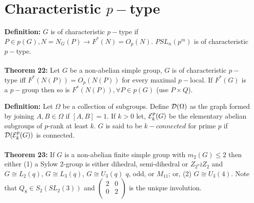 \section {Characteristic $p-$type}
{\bf Definition:}
$G$ is of characteristic $p-$type if $P \in p(G), N= N_G(P) \rightarrow F^*(N)=O_p(N)$.
$PSL_n(p^m)$ is of characteristic $p-$type.  \\
\\
{\bf Theorem 22:} Let $G$ be a non-abelian simple group,
$G$ is of characteristic $p-$type iff $F^*(N(P))= O_p(N(P))$ for every maximal $p-$local.
If $F^*(G)$ is a $p-$group then so is $F^*(N(P)), \forall P \in p(G)$ (use $P \times Q$).
\begin{quote}
\end{quote}
{\bf Definition:}
Let $\Omega$ be a collection of subgroups.  Define ${\cal D} (\Omega)$ as the graph
formed by joining $A,B \in \Omega$ if $[A,B]=1$. If $k > 0$ let, ${\cal E}^p_k (G)$
be the elementary abelian subgroups of $p$-rank at least $k$. $G$ is said to be
$k-connected$ for prime $p$ if ${\cal D} ( {\cal E}^p_k (G))$
is connected.
\\
\\
{\bf Theorem 23:}
If $G$ is a non-abelian finite simple group
with $m_2(G) \le 2$ then either (1) a Sylow 2-group is either dihedral, semi-dihedral
or $Z_{2^n} \wr Z_2$ and
$G \cong L_2(q)$,
$G \cong L_3(q)$,
$G \cong U_3(q)$ $q$, odd, or $M_{11}$; or,  (2)
$G \cong U_3(4)$.
Note that $Q_8 \in S_2(SL_2(3))$ and $\left(
\begin{array}{cc}
2 &  0 \\
0 &  2 \\
\end{array}
\right)$ is the unique involution.
\begin{quote}
\end{quote}
